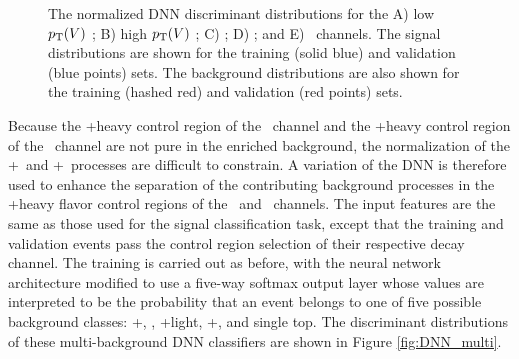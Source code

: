 \begin{figure}[htbp]
{  }
  \caption[Normalized DNN Discriminant Distributions]{The normalized DNN discriminant distributions for the A) low $p_{\mathrm{T}}(V)$ \ZllH; B) high $p_{\mathrm{T}}(V)$ \ZllH; C) \WenH; D) \WmnH; and E) \ZnnH\ channels. The signal distributions are shown for the training (solid blue) and validation (blue points) sets. The background distributions are also shown for the training (hashed red) and validation (red points) sets.}
  \label{fig:DNN_overtrain}
\end{figure}

Because the \bosZ+heavy control region of the \ZnnH\ channel and the \bosW+heavy control region of the \WlnH\ channel are not pure in the enriched background, the normalization of the \bosV+\qrkb\ and \bosV+\qrkb\qrkbbar\ processes are difficult to constrain. A variation of the DNN is therefore used to enhance the separation of the contributing background processes in the \bosV+heavy flavor control regions of the \ZnnH\ and \WlnH\ channels. The input features are the same as those used for the signal classification task, except that the training and validation events pass the control region selection of their respective decay channel. The training is carried out as before, with the neural network architecture modified to use a five-way softmax output layer whose values are interpreted to be the probability that an event belongs to one of five possible background classes: \bosV+\qrkb\qrkbbar, \qrkt\qrktbar, \bosV+light, \bosV+\qrkb, and single top. The discriminant distributions of these multi-background DNN classifiers are shown in Figure \ref{fig:DNN_multi}.

